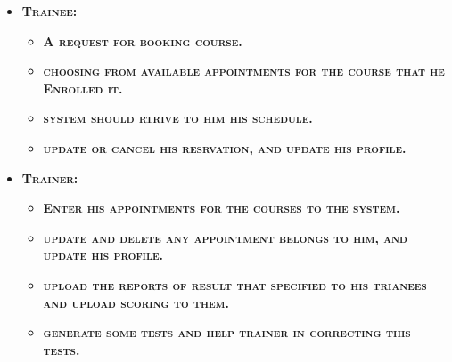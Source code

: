 \documentclass[../Psychological_system_web_application.tex]{subfiles}
\begin{document}
					\begin{itemize}
					\item
							\textbf{\textsc{\color{red}Trainee:}}
					\begin{itemize}
						\item
							\textbf{\textsc{\color{blue}A request for booking course.}}
						\item
							\textbf{\textsc{\color{blue}choosing from available appointments for the course that he Enrolled it.}}
						\item
							\textbf{\textsc{\color{blue}system should rtrive to him his schedule.}}
						\item
							\textbf{\textsc{\color{blue}update or cancel his resrvation, and update his profile.}}
					\end{itemize}
					
					\item
							\textbf{\textsc{\color{red}Trainer:}}
							\begin{itemize}
							\item
								\textbf{\textsc{\color{blue}Enter his appointments for the courses to the system.}}
							\item
								\textbf{\textsc{\color{blue}update and delete any appointment belongs to him, and update his profile.}}
							\item
								\textbf{\textsc{\color{blue}upload the reports of result that specified to his trianees and upload scoring to them.}}
							\item
								\textbf{\textsc{\color{blue}generate some tests and help trainer in correcting this tests.}}
					\end{itemize}
				\end{itemize}
		
\end{document}
